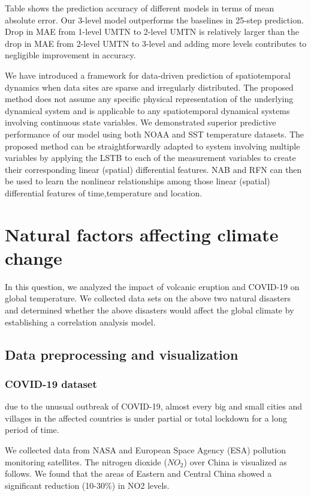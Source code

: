 \documentclass{apmcmthesis}
\begin{document}
Table shows the prediction accuracy of different models in terms of mean absolute error. Our 3-level model outperforms the baselines in 25-step prediction. Drop in MAE from 1-level UMTN to 2-level UMTN is relatively larger than the drop in MAE from 2-level UMTN to 3-level and adding more levels contributes to negligible improvement in accuracy. 

We have introduced a framework for data-driven prediction of spatiotemporal dynamics when
data sites are sparse and irregularly distributed. The proposed method does not assume
any specific physical representation of the underlying dynamical system and is applicable to any spatiotemporal dynamical systems involving continuous state variables. We demonstrated
superior predictive performance of our model using both NOAA and SST temperature datasets. The
proposed method can be straightforwardly adapted to system involving multiple variables by
applying the LSTB to each of the measurement variables to create their corresponding linear
(spatial) differential features. NAB and RFN can then be used to learn the nonlinear relationships
among those linear (spatial) differential features of time,temperature and location.


\section{Natural factors affecting climate change}
In this question, we analyzed the impact of volcanic eruption and COVID-19 on global temperature. We collected data sets on the above two natural disasters and determined whether the above disasters would affect the global climate by establishing a correlation analysis model.

\subsection{Data preprocessing and visualization}
\subsubsection{COVID-19 dataset}
due to the unusual outbreak of COVID-19, almost every big and small cities 
and villages in the affected countries is under partial or total lockdown for a long period of time.

We collected data from NASA and European Space Agency (ESA) pollution monitoring satellites. The nitrogen dioxide ($NO_2$) over China is visualized as follows.\cite{no_2} We found that the areas of Eastern and Central China showed a significant reduction (10-30\%) in NO2 levels.
\end{document}
